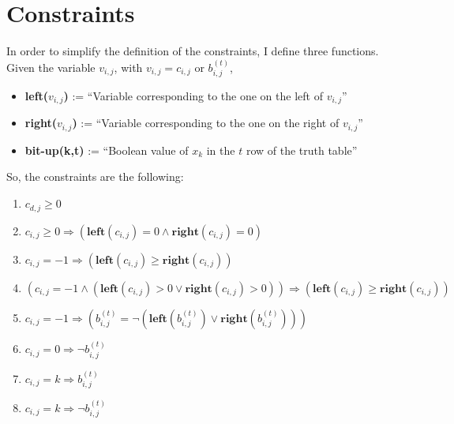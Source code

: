 \documentclass[letterpaper,10pt]{article}
\begin{document}
\section{Constraints}
In order to simplify the definition of the constraints, I define three functions. Given the variable $v_{i,j}$, with $v_{i,j} = c_{i,j}$ or $b_{i,j}^{(t)}$,
\begin{itemize}
    \item \textbf{left($v_{i,j}$)} := ``Variable corresponding to the one on the left of $v_{i,j}$''
    \item \textbf{right($v_{i,j}$)} := ``Variable corresponding to the one on the right of $v_{i,j}$''
    \item \textbf{bit-up(k,t)} := ``Boolean value of $x_k$ in the $t$ row of the truth table''
\end{itemize}

So, the constraints are the following:
\begin{enumerate}
    \item $c_{d,j} \geq 0$
    \item $c_{i,j} \geq 0 \Rightarrow (\mathbf{left}(c_{i,j}) = 0 \land \mathbf{right}(c_{i,j}) = 0)$
    \item $c_{i,j} = -1 \Rightarrow (\mathbf{left}(c_{i,j}) \geq \mathbf{right}(c_{i,j}))$
    \item $(c_{i,j} = -1 \land (\mathbf{left}(c_{i,j}) > 0 \lor \mathbf{right}(c_{i,j}) > 0)) \Rightarrow (\mathbf{left}(c_{i,j}) \geq \mathbf{right}(c_{i,j}))$
    \item $c_{i,j} = -1 \Rightarrow (b_{i,j}^{(t)} = \lnot (\mathbf{left}(b_{i,j}^{(t)}) \lor \mathbf{right}(b_{i,j}^{(t)})))$
    \item $c_{i,j} = 0 \Rightarrow \lnot b_{i,j}^{(t)}$
    \item $c_{i,j} = k \Rightarrow b_{i,j}^{(t)}$
    \item $c_{i,j} = k \Rightarrow \lnot b_{i,j}^{(t)}$
\end{enumerate}
\end{document}
